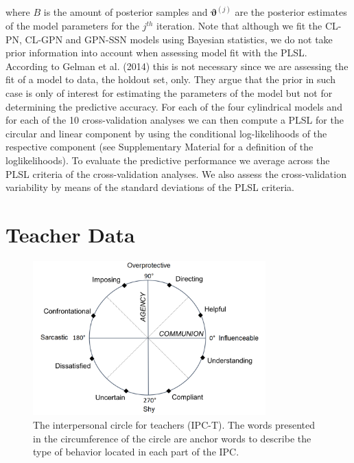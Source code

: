 \documentclass[man,mask]{apa6}
\begin{document}
\noindent where \(B\) is the amount of posterior samples and
\(\boldsymbol{\vartheta}^{(j)}\) are the posterior estimates of the model
parameters for the \(j^{th}\) iteration. Note that although we fit the CL-PN,
CL-GPN and GPN-SSN models using Bayesian statistics, we do not take prior
information into account when assessing model fit with the PLSL. According to
Gelman et al. (2014) this is not necessary since we are assessing the fit of a model to data,
the holdout set, only. They argue that the prior in such case is only of
interest for estimating the parameters of the model but not for determining the
predictive accuracy.\newline
\indent For each of the four cylindrical models and for each of the 10
cross-validation analyses we can then compute a PLSL for the circular and linear
component by using the conditional log-likelihoods of the respective component (see
Supplementary Material for a definition of the loglikelihoods). To evaluate the
predictive performance we average across the PLSL criteria of the
cross-validation analyses. We also assess the cross-validation variability by
means of the standard deviations of the PLSL criteria.

\section{Teacher Data}\label{Example}
\begin{figure}
\centering
\includegraphics[width = 0.8\textwidth]{Plots/IPC-T2.png}
\caption{The interpersonal circle for teachers (IPC-T). The words presented in
the circumference of the circle are anchor words to describe the type of
behavior located in each part of the IPC.}
\label{QTI}
\end{figure}
\end{document}
